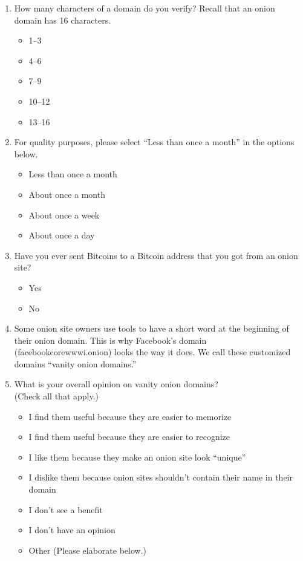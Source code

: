 \begin{enumerate}
    \item How many characters of a domain do you verify? Recall that an onion
        domain has 16 characters.
        \begin{itemize}[label=$\Circle$]
            \item 1--3
            \item 4--6
            \item 7--9
            \item 10--12
            \item 13--16
        \end{itemize}

    \item For quality purposes, please select ``Less than once a month'' in the
        options below.
        \begin{itemize}[label=$\Circle$]
            \item Less than once a month
            \item About once a month
            \item About once a week
            \item About once a day
        \end{itemize}

    \item Have you ever sent Bitcoins to a Bitcoin address that you got from an
        onion site?
        \begin{itemize}[label=$\Circle$]
            \item Yes
            \item No
        \end{itemize}

    \item Some onion site owners use tools to have a short word at the
        beginning of their onion domain. This is why Facebook's domain
        (facebookcorewwwi.onion) looks the way it does. We call these
        customized domains ``vanity onion domains.''

    \item What is your overall opinion on vanity onion domains?\\(Check all
        that apply.)
        \begin{itemize}[label=$\Square$]
            \item I find them useful because they are easier to memorize
            \item I find them useful because they are easier to recognize
            \item I like them because they make an onion site look ``unique''
            \item I dislike them because onion sites shouldn't contain their
                name in their domain
            \item I don't see a benefit
            \item I don't have an opinion
            \item Other (Please elaborate below.)
        \end{itemize}
\end{enumerate}

